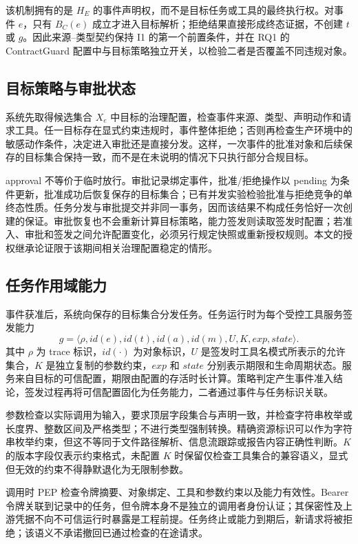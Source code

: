 该机制拥有的是 $H_E$ 的事件声明权，而不是目标任务或工具的最终执行权。对事件 $e$，只有 $B_C(e)$ 成立才进入目标解析；拒绝结果直接形成终态证据，不创建 $t$ 或 $g$。因此来源--类型契约保持 I1 的第一个前置条件，并在 RQ1 的 ContractGuard 配置中与目标策略独立开关，以检验二者是否覆盖不同违规对象。

\subsection{目标策略与审批状态}

系统先取得候选集合 $X_e$ 中目标的治理配置，检查事件来源、类型、声明动作和请求工具。任一目标存在显式约束违规时，事件整体拒绝；否则再检查生产环境中的敏感动作条件，决定进入审批还是直接分发。这样，一次事件的批准对象和后续保存的目标集合保持一致，而不是在未说明的情况下只执行部分合规目标。

approval 不等价于临时放行。审批记录绑定事件，批准/拒绝操作以 pending 为条件更新，批准成功后恢复保存的目标集合；已有并发实验检验批准与拒绝竞争的单终态性质。任务分发与审批提交并非同一事务，因而该结果不构成任务恰好一次创建的保证。审批恢复也不会重新计算目标策略，能力签发则读取签发时配置；若准入、审批和签发之间允许配置变化，必须另行规定快照或重新授权规则。本文的授权继承论证限于该期间相关治理配置稳定的情形。

\subsection{任务作用域能力}

事件获准后，系统向保存的目标集合分发任务。任务运行时为每个受控工具服务签发能力
\begin{equation}
g=\langle \rho,id(e),id(t),id(a),id(m),U,K,exp,state\rangle .
\label{eq:grant-v11}
\end{equation}
其中 $\rho$ 为 trace 标识，$id(\cdot)$ 为对象标识，$U$ 是签发时工具名模式所表示的允许集合，$K$ 是独立复制的参数约束，$exp$ 和 $state$ 分别表示期限和生命周期状态。服务来自目标的可信配置，期限由配置的存活时长计算。策略判定产生事件准入结论，签发过程再将可信配置固化为任务能力，二者通过事件与任务标识关联。

参数检查以实际调用为输入，要求顶层字段集合与声明一致，并检查字符串枚举或长度界、整数区间及严格类型；不进行类型强制转换。精确资源标识可以作为字符串枚举约束，但这不等同于文件路径解析、信息流跟踪或报告内容正确性判断。$K$ 的版本字段仅表示约束格式，未配置 $K$ 时保留仅检查工具集合的兼容语义，显式但无效的约束不得静默退化为无限制参数。

调用时 PEP 检查令牌摘要、对象绑定、工具和参数约束以及能力有效性。Bearer 令牌关联到记录中的任务，但令牌本身不是独立的调用者身份认证；其保密性及上游凭据不向不可信运行时暴露是工程前提。任务终止或能力到期后，新请求将被拒绝；该语义不承诺撤回已通过检查的在途请求。

